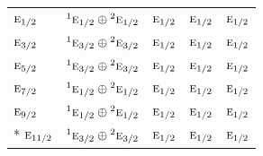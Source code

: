 \documentclass[10pt,a4paper]{article}
\numberwithin{equation}{section}
\newcommand{\irr}[1]{\text{\normalfont\scshape #1}}
\newcommand{\conjpair}[1]{{}^{#1}}
\begin{document}
{\begin{longtable}{@{}lcccc@{}}
$\irr{e}_{1/2}$ & $\conjpair{1}\irr{e}_{1/2}\oplus \conjpair{2}\irr{e}_{1/2}$ & $\irr{e}_{1/2}$ & $\irr{e}_{1/2}$ & $\irr{e}_{1/2}$\\
$\irr{e}_{3/2}$ & $\conjpair{1}\irr{e}_{3/2}\oplus \conjpair{2}\irr{e}_{3/2}$ & $\irr{e}_{1/2}$ & $\irr{e}_{1/2}$ & $\irr{e}_{1/2}$\\
$\irr{e}_{5/2}$ & $\conjpair{1}\irr{e}_{3/2}\oplus \conjpair{2}\irr{e}_{3/2}$ & $\irr{e}_{1/2}$ & $\irr{e}_{1/2}$ & $\irr{e}_{1/2}$\\
$\irr{e}_{7/2}$ & $\conjpair{1}\irr{e}_{1/2}\oplus \conjpair{2}\irr{e}_{1/2}$ & $\irr{e}_{1/2}$ & $\irr{e}_{1/2}$ & $\irr{e}_{1/2}$\\
$\irr{e}_{9/2}$ & $\conjpair{1}\irr{e}_{1/2}\oplus \conjpair{2}\irr{e}_{1/2}$ & $\irr{e}_{1/2}$ & $\irr{e}_{1/2}$ & $\irr{e}_{1/2}$\\*
$\irr{e}_{11/2}$ & $\conjpair{1}\irr{e}_{3/2}\oplus \conjpair{2}\irr{e}_{3/2}$ & $\irr{e}_{1/2}$ & $\irr{e}_{1/2}$ & $\irr{e}_{1/2}$\\
\bottomrule\end{longtable}}
\end{document}
